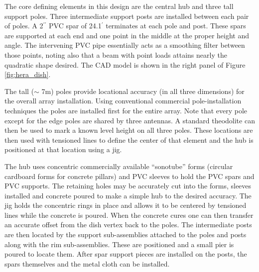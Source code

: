 \documentclass[preprint]{aastex}
\begin{document}

The core defining elements in this design are the central hub and three tall support poles.  Three intermediate 
support posts are installed between each pair of poles.  A 2$^{\prime\prime}$ PVC spar of 24.1$^{\prime}$ 
terminates at each pole and post.  These spars are supported at each end and one point in the middle at the 
proper height and angle.  The intervening PVC pipe essentially acts as a smoothing filter between those 
points, noting also that a beam with point loads attains nearly the quadratic shape desired.  The CAD model is 
shown in the right panel of Figure \ref{fig:hera_dish}.  

The tall ($\sim$ 7m) poles provide locational accuracy (in all three dimensions) for the overall array installation.  
Using conventional commercial pole-installation techniques the poles are installed first for the entire array.  
Note that every pole except for the edge poles are shared by three antennas.  A standard theodolite can 
then be used to mark a known level height on all three poles.  These locations are then used with tensioned 
lines to define the center of that element and the hub is positioned at that location using a jig.

The hub uses concentric commercially available ``sonotube'' forms (circular cardboard forms for concrete pillars) 
and PVC sleeves to hold the PVC spars and PVC supports.  The retaining holes may be accurately cut into 
the forms, sleeves installed and concrete poured to make a simple hub to the desired accuracy.  The jig holds 
the concentric rings in place and allows it to be centered by tensioned lines while the concrete is poured.  
When the concrete cures one can then transfer an accurate offset from the dish vertex back to the poles.
The intermediate posts are then located by the support sub-assemblies attached to the poles and posts along 
with the rim sub-assemblies.  These are positioned and a small pier is poured to locate them.  After spar support 
pieces are installed on the posts, the spars themselves and the metal cloth can be installed.
\end{document}
